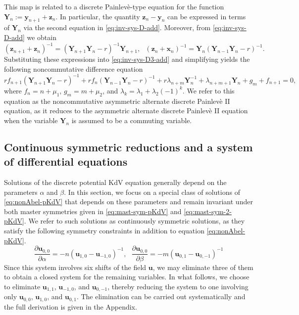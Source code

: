 \documentclass[dvips,10pt]{article}
\newcommand{\bs}{\boldsymbol}
\newcommand{\bsu}{ {\bs{u}}}
\newcommand{\bsx}{ {\bs{x}}}
\newcommand{\bsz}{ {\bs{z}}}
\newcommand{\bsy}{ {\bs{y}}}
\newcommand{\bsY}{ {\bs{Y}}}
\theoremstyle{remark} %
\begin{document}
	This map is related to a discrete Painlev\`e-type equation for the function $\bsY_n := \bsy_{n+1} + \bsz_n$. In particular, the quantity $\bsz_n - \bsy_n$ can be expressed in terms of $\bsY_n$ via the second equation in \eqref{eq:inv-sys-D-add}. Moreover, from \eqref{eq:inv-sys-D-add} we obtain
	$$(\bsz_{n+1}+\bsz_n)^{-1} = \left(\bsY_{n+1} \bsY_n -r \right)^{-1} \bsY_{n+1}, ~~~ (\bsz_{n}+\bsx_{n})^{-1} = \bsY_n \left(\bsY_{n-1} \bsY_n -r \right)^{-1}.$$
	Substituting these expressions into \eqref{eq:inv-sys-D3-add} and simplifying yields the following noncommutative difference equation
	\begin{equation} \label{eq:dPII}
		r f_{n+1} \left( \bsY_{n+1} \bsY_n - r \right)^{-1} + r f_{n} \left( \bsY_{n-1} \bsY_n - r \right)^{-1}  + r \lambda_{n+m} \bsY_n^{-1} + \lambda_{n+m+1} \bsY_n + g_m + f_{n+1} = 0,
	\end{equation}
	where $f_n = n + \mu_1$, $g_m = m + \mu_2$, and $\lambda_k = \lambda_1 + \lambda_2 (-1)^k$.  We refer to this equation as the noncommutative asymmetric alternate discrete Painlev\`e II equation, as it reduces to the asymmetric alternate discrete Painlev\`e II equation \cite{FGR} when the variable $\bsY_n$ is assumed to be a commuting variable.
	
	
	
	\subsection{Continuous symmetric reductions and a system of differential equations} \label{sec:rpde}
	
	Solutions of the discrete potential KdV equation generally depend on the parameters $\alpha$ and $\beta$. In this section, we focus on a special class of solutions of \eqref{eq:nonAbel-pKdV} that depends on these parameters and remain invariant under both master symmetries given in \eqref{eq:mast-sym-pKdV} and \eqref{eq:mast-sym-2-pKdV}. We refer to such solutions as continuously symmetric solutions, as they satisfy the following symmetry constraints in addition to equation \eqref{eq:nonAbel-pKdV}.
	\begin{equation}\label{eq:con-const}
		\frac{\partial {\bs{u}}_{0,0}}{\partial \alpha} =  -n \left({\bs{u}}_{1,0} -{\bs{u}}_{-1,0}\right)^{-1}, ~~~ 	\frac{\partial {\bs{u}}_{0,0}}{\partial \beta} =  -m \left({\bs{u}}_{0,1} -{\bs{u}}_{0,-1}\right)^{-1}
	\end{equation}
	Since this system involves six shifts of the field $\bsu$, we may eliminate three of them to obtain a closed system for the remaining variables. In what follows, we choose to eliminate $\bsu_{1,1}$, $\bsu_{-1,0}$, and $\bsu_{0,-1}$, thereby reducing the system to one involving only $\bsu_{0,0}$, $\bsu_{1,0}$, and $\bsu_{0,1}$. The elimination can be carried out systematically and the full derivation is given in the Appendix.
	
\end{document}
